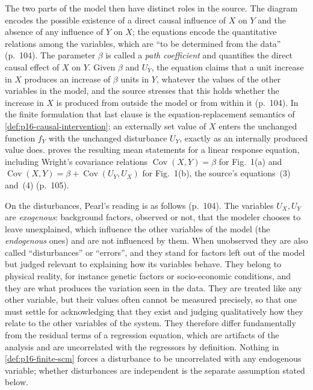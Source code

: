 The two parts of the model then have distinct roles in the source. The
diagram encodes the possible existence of a direct causal influence of
\(X\) on \(Y\) and the absence of any influence of \(Y\) on \(X\); the
equations encode the quantitative relations among the variables, which
are ``to be determined from the data'' (p.~104). The parameter \(\beta\)
is called a \emph{path coefficient} and quantifies the direct causal
effect of \(X\) on \(Y\). Given \(\beta\) and \(U_Y\), the equation
claims that a unit increase in \(X\) produces an increase of \(\beta\)
units in \(Y\), whatever the values of the other variables in the model,
and the source stresses that this holds whether the increase in \(X\) is
produced from outside the model or from within it (p.~104). In the finite
formulation that last clause is the equation-replacement semantics of
\cref{def:p16-causal-intervention}: an externally set value of \(X\)
enters the unchanged function \(f_Y\) with the unchanged disturbance
\(U_Y\), exactly as an internally produced value does.
 proves the resulting mean
statements for a linear response equation, including Wright's covariance
relations \(\operatorname{Cov}(X,Y)=\beta\) for Fig.~1(a) and
\(\operatorname{Cov}(X,Y)=\beta+\operatorname{Cov}(U_Y,U_X)\) for
Fig.~1(b), the source's equations~(3) and~(4) (p.~105).

On the disturbances, Pearl's reading is as follows (p.~104). The
variables \(U_X,U_Y\) are \emph{exogenous}: background factors, observed
or not, that the modeler chooses to leave unexplained, which influence the
other variables of the model (the \emph{endogenous} ones) and are not
influenced by them. When unobserved they are also called
``disturbances'' or ``errors'', and they stand for factors left out of
the model but judged relevant to explaining how its variables behave.
They belong to physical reality, for instance genetic factors or
socio-economic conditions, and they are what produces the variation seen
in the data. They are treated like any other variable, but their values
often cannot be measured precisely, so that one must settle for
acknowledging that they exist and judging qualitatively how they relate to
the other variables of the system. They therefore differ fundamentally from
the residual terms of a regression equation, which are artifacts of the
analysis and are uncorrelated with the regressors by definition. Nothing in
\cref{def:p16-finite-scm} forces a disturbance to be uncorrelated with any
endogenous variable; whether disturbances are independent is the separate
assumption stated below.


